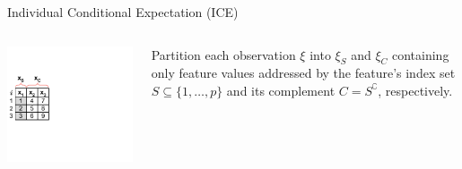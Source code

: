 \documentclass[11pt,compress,t,notes=noshow, xcolor=table]{beamer}
\begin{document}
\begin{vbframe}{Individual Conditional Expectation (ICE)}

\begin{columns}[T]
\begin{column}{0.18\textwidth} %
\includegraphics[page=1, trim=0cm 0.35cm 4.53cm 0.35cm, clip, width=\textwidth]{figure_man/ice_plot_demo}
\end{column}
\begin{column}{0.82\textwidth}
Partition each observation $\xi$ into $\xi_S$ and $\xi_C$ containing only feature values addressed by the feature's index set $S \subseteq \{1, \dots, p\}$ and its complement $C = S^\complement$, respectively.
\lz


\end{column}
\end{columns}
\end{vbframe}
\end{document}
